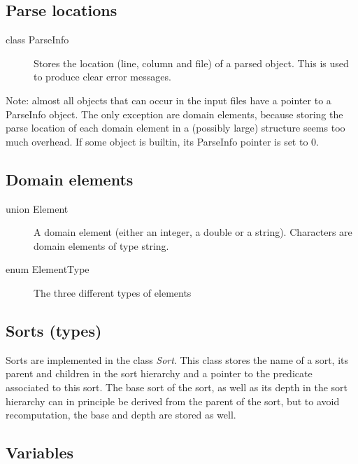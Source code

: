 \documentclass{article}
\begin{document}
\subsection*{Parse locations}

\begin{description}
	\item[class ParseInfo] Stores the location (line, column and file) of a parsed object. This is used to produce clear error messages.
\end{description}
Note: almost all objects that can occur in the input files have a pointer to a ParseInfo object. The only exception are domain elements, because storing the parse location of each domain element in a (possibly large) structure seems too much overhead. If some object is builtin, its ParseInfo pointer is set to 0.

\subsection*{Domain elements}

\begin{description}
	\item[union Element] A domain element (either an integer, a double or a string). Characters are domain elements of type string.  
	\item[enum ElementType] The three different types of elements
\end{description}

\subsection*{Sorts (types)}

Sorts are implemented in the class \emph{Sort}. This class stores the name of a sort, its parent and children in the sort hierarchy and a pointer to the predicate associated to this sort. The base sort of the sort, as well as its depth in the sort hierarchy can in principle be derived from the parent of the sort, but to avoid recomputation, the base and depth are stored as well.

\subsection*{Variables}
\end{document}
